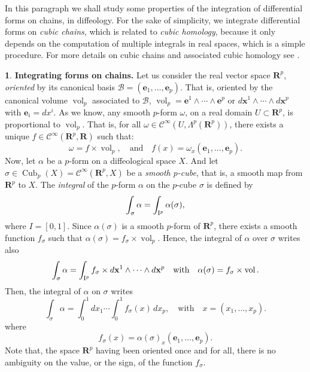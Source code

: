 \documentclass[11pt,reqno]{amsart}
\theoremstyle{definition}
\newtheorem{article}{}
\newcommand{\artlabel}[1]{{\bf #1.}}
\newcommand{\qmbox}[1]{\quad \mbox{#1}\quad}
\newcommand{\RR}{{\mathbf R}}
\newcommand{\ee}{{\mathbf e}}
\newcommand{\xx}{{\mathbf x}}
\def \I{{I}}
\def \U{{U}}
\def \X{{X}}
\newcommand{\cB}{{\mathcal B}}
\newcommand{\cC}{{\mathcal C}}
\newcommand{\Form}{\mbox{$\Lambda$}}
\newcommand{\cub}[1]{{\rm I}^{#1}}
\newcommand{\DCubes}[1]{\operatorname{Cub}_{#1}}
\newcommand{\Cinf}{{\cC}^\infty}
\newcommand{\closedinterval}[1]{\left[ #1 \right]}
\newcommand{\vol}{\operatorname{vol}}
\begin{document}
  \begin{text}
    In this paragraph we shall study some properties of the integration of
    differential forms on chains, in diffeology. For the sake of simplicity, 
    we integrate differential forms on {\em cubic chains}, which is
    related to {\em cubic homology}, because it only depends on
    the computation of multiple integrals in real spaces, which is a simple
    procedure. For more details on cubic chains and
    associated cubic homology see \cite{Piz05}.
  \end{text} 
  
  \begin{article}\artlabel{Integrating forms on chains}
    \label{Integrating-forms-on-chains} 
    Let us consider the real vector space
    $\RR^p$, {\em oriented} by its canonical basis $\cB =
      (\ee_1,\ldots,\ee_p)$. That is, oriented by the canonical
    volume $\vol_p$ associated to $\cB$, 
    $\vol_p = \ee^1\wedge\cdots\wedge \ee^p$ or 
      $d\xx^1\wedge\cdots\wedge d\xx^p$ with $\ee_i = dx^i$.
    As we know, any smooth
    $p$-form $\omega$, on a real domain $\U \subset
      \RR^p$, is proportional to $\vol_p$. That is, for all
    $\omega \in \Cinf(\U,\Form^p(\RR^p))$, there exists a
    unique $f \in \Cinf(\RR^p,\RR)$  such that:
    $$
      \omega = f\times \vol_p, \qmbox{and} f(x) = 
      \omega_x(\ee_1,\ldots,\ee_p).
      $$
    Now, let $\alpha$ be a $p$-form on a diffeological space
    $\X$. And let $\sigma \in \DCubes{p}(\X) =
      \Cinf(\RR^p,\X)$ be a {\em smooth $p$-cube}, that is, a smooth
    map from $\RR^p$ to $\X$. The {\em integral} of the
    $p$-form $\alpha$ on the $p$-cube $\sigma$ is defined by
    \begin{equation}
      \renewcommand{\theequation}{$\diamondsuit$}
      \int_\sigma \alpha = \int_{\cub{p}} \alpha(\sigma),
    \end{equation}
    where $\I = \closedinterval{0,1}$. Since
    $\alpha(\sigma)$ is a smooth $p$-form of $\RR^p$, there
    exists a smooth function $f_\sigma$ such that
    $\alpha(\sigma) = f_\sigma \times \vol_p$. Hence, the
    integral of $\alpha$ over $\sigma$ writes also
    $$
      \int_\sigma \alpha = \int_{\cub{p}} f_\sigma
      \times d\xx^1\wedge\cdots\wedge d\xx^p \qmbox{with} \alpha(\sigma) = 
      f_\sigma \times \vol.
      $$ 
    Then, the
    integral of $\alpha$ on $\sigma$ writes
    $$
      \int_\sigma \alpha =  \int_0^1 dx_1 \cdots\int_0^1 f_\sigma(x) \, dx_p, \qmbox{with} x =
      (x_1,\ldots,x_p).
      $$
    where
    $$
      f_\sigma(x) = 
      \alpha(\sigma)_x(\ee_1,\ldots,\ee_p).
      $$
    Note that, the space $\RR^p$ having been oriented once
    and for all, there is no ambiguity on the value, or the
    sign, of the function $f_\sigma$. 
    

\end{article}
\end{document}
